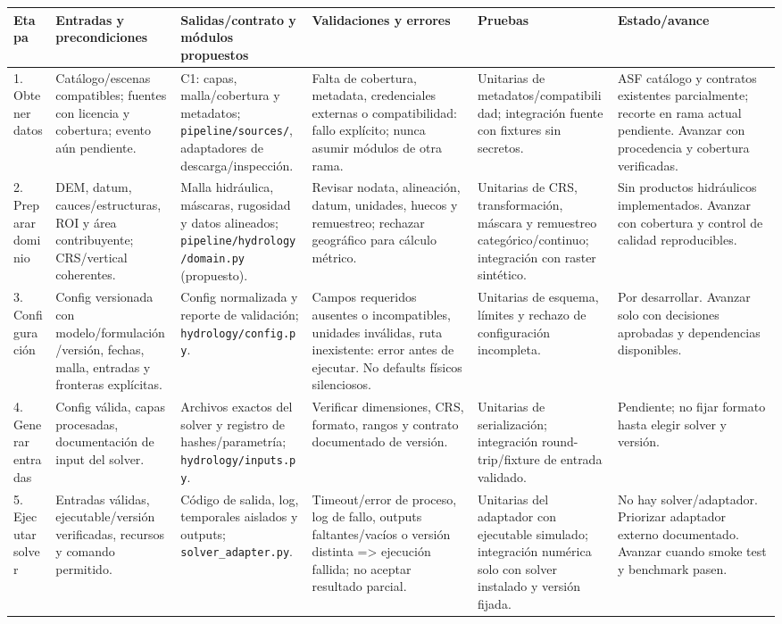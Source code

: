\documentclass[11pt,a4paper]{article}
\begin{document}
\begin{landscape}
\footnotesize
\begin{longtable}{p{.10\linewidth}p{.17\linewidth}p{.19\linewidth}p{.17\linewidth}p{.16\linewidth}p{.14\linewidth}}
\toprule Etapa & Entradas y precondiciones & Salidas/contrato y módulos propuestos & Validaciones y errores & Pruebas & Estado/avance\\\midrule
\endhead
1. Obtener datos & Catálogo/escenas compatibles; fuentes con licencia y cobertura; evento aún pendiente. & C1: capas, malla/cobertura y metadatos; \texttt{pipeline/sources/}, adaptadores de descarga/inspección. & Falta de cobertura, metadata, credenciales externas o compatibilidad: fallo explícito; nunca asumir módulos de otra rama. & Unitarias de metadatos/compatibilidad; integración fuente con fixtures sin secretos. & ASF catálogo y contratos existentes parcialmente; recorte en rama actual pendiente. Avanzar con procedencia y cobertura verificadas.\\
2. Preparar dominio & DEM, datum, cauces/estructuras, ROI y área contribuyente; CRS/vertical coherentes. & Malla hidráulica, máscaras, rugosidad y datos alineados; \texttt{pipeline/hydrology/domain.py} (propuesto). & Revisar nodata, alineación, datum, unidades, huecos y remuestreo; rechazar geográfico para cálculo métrico. & Unitarias de CRS, transformación, máscara y remuestreo categórico/continuo; integración con raster sintético. & Sin productos hidráulicos implementados. Avanzar con cobertura y control de calidad reproducibles.\\
3. Configuración & Config versionada con modelo/formulación/versión, fechas, malla, entradas y fronteras explícitas. & Config normalizada y reporte de validación; \texttt{hydrology/config.py}. & Campos requeridos ausentes o incompatibles, unidades inválidas, ruta inexistente: error antes de ejecutar. No defaults físicos silenciosos. & Unitarias de esquema, límites y rechazo de configuración incompleta. & Por desarrollar. Avanzar solo con decisiones aprobadas y dependencias disponibles.\\
4. Generar entradas & Config válida, capas procesadas, documentación de input del solver. & Archivos exactos del solver y registro de hashes/parametría; \texttt{hydrology/inputs.py}. & Verificar dimensiones, CRS, formato, rangos y contrato documentado de versión. & Unitarias de serialización; integración round-trip/fixture de entrada validado. & Pendiente; no fijar formato hasta elegir solver y versión.\\
5. Ejecutar solver & Entradas válidas, ejecutable/versión verificadas, recursos y comando permitido. & Código de salida, log, temporales aislados y outputs; \texttt{solver\_adapter.py}. & Timeout/error de proceso, log de fallo, outputs faltantes/vacíos o versión distinta => ejecución fallida; no aceptar resultado parcial. & Unitarias del adaptador con ejecutable simulado; integración numérica solo con solver instalado y versión fijada. & No hay solver/adaptador. Priorizar adaptador externo documentado. Avanzar cuando smoke test y benchmark pasen.\\

\end{longtable}
\end{landscape}
\end{document}
